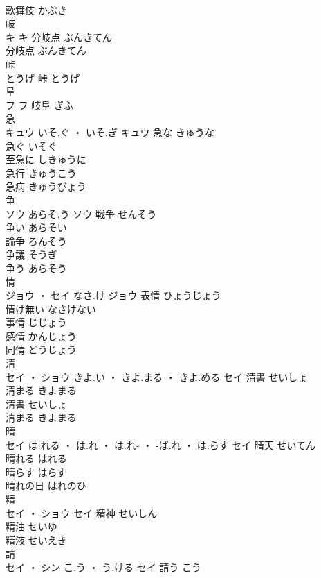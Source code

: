 \documentclass[8pt]{extreport}
\begin{document}
\begin{CJK}{UTF8}{min}
\\	歌舞伎	かぶき	
\\	岐	
\\	キ		キ	分岐点	ぶんきてん	
\\	分岐点	ぶんきてん	
\\	峠	
\\	とうげ														峠	とうげ	
\\	阜	
\\	フ		フ													岐阜	ぎふ	
\\	急	
\\	キュウ	いそ.ぐ ・ いそ.ぎ	キュウ	急な	きゅうな	
\\	急ぐ	いそぐ	
\\	至急に	しきゅうに	
\\	急行	きゅうこう	
\\	急病	きゅうびょう	
\\	争	
\\	ソウ	あらそ.う	ソウ	戦争	せんそう	
\\	争い	あらそい	
\\	論争	ろんそう	
\\	争議	そうぎ	
\\	争う	あらそう	
\\	情	
\\	ジョウ ・ セイ	なさ.け	ジョウ	表情	ひょうじょう	
\\	情け無い	なさけない	
\\	事情	じじょう	
\\	感情	かんじょう	
\\	同情	どうじょう	
\\	清	
\\	セイ ・ ショウ	きよ.い ・ きよ.まる ・ きよ.める	セイ	清書	せいしょ	
\\	清まる	きよまる	
\\	清書	せいしょ	
\\	清まる	きよまる	
\\	晴	
\\	セイ	は.れる ・ は.れ ・ は.れ- ・ -ば.れ ・ は.らす	セイ	晴天	せいてん	
\\	晴れる	はれる	
\\	晴らす	はらす	
\\	晴れの日	はれのひ	
\\	精	
\\	セイ ・ ショウ		セイ	精神	せいしん	
\\	精油	せいゆ	
\\	精液	せいえき	
\\	請	
\\	セイ ・ シン	こ.う ・ う.ける	セイ	請う	こう	

\end{CJK}
\end{document}
